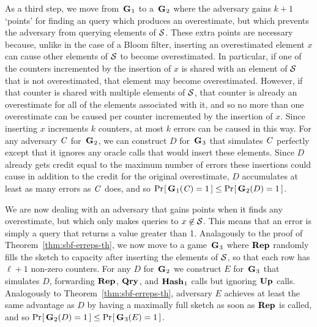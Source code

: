 As a third step, we move from~$\textup{\textbf{G}}\hspace{0.5pt}_1$ to a~$\textup{\textbf{G}}\hspace{0.5pt}_2$ where the adversary gains
$k+1$ `points' for finding an query which produces an
overestimate, but which prevents the adversary from querying elements of $\mathcal{S}$.
These extra points are necessary because, unlike in the case of a Bloom
filter, inserting an overestimated element $x$ can cause other elements of
$\mathcal{S}$ to become overestimated. In particular, if one of the counters
incremented by the insertion of $x$ is shared with an element of $\mathcal{S}$ that is
not overestimated, that element may become overestimated. However, if that
counter is shared with multiple elements of $\mathcal{S}$, that counter is already an
overestimate for all of the elements associated with it, and so no more than one
overestimate can be caused per counter incremented by the insertion of $x$.
Since inserting $x$ increments $k$ counters, at most $k$ errors can be caused in
this way. For any adversary $\mathit{C}$ for~$\textup{\textbf{G}}\hspace{0.5pt}_2$, we can construct $D$
for~$\textup{\textbf{G}}\hspace{0.5pt}_3$ that simulates $\mathit{C}$ perfectly except that it ignores any oracle
calls that would insert these elements. Since $D$ already gets credit equal to
the maximum number of errors these insertions could cause in addition to the
credit for the original overestimate, $D$ accumulates at least as many errors as
$\mathit{C}$ does, and so $\Pr\hspace{-1pt}\left[\,\textup{\textbf{G}}\hspace{0.5pt}_1(\mathit{C}) = 1\,\right] \le \Pr\hspace{-1pt}\left[\,\textup{\textbf{G}}\hspace{0.5pt}_2(D) = 1\,\right]$.

We are now dealing with an adversary that gains points when it finds any
overestimate, but which only makes queries to $x\not\in\mathcal{S}$. This means that an
error is simply a query that returns a value greater than 1.
Analagously to the proof of Theorem~\ref{thm:sbf-erreps-th}, we now move to a
game~$\textup{\textbf{G}}\hspace{0.5pt}_3$ where $\textup{\textbf{Rep}}\hspace{0.5pt}$ randomly fills the sketch to capacity after
inserting the elements of $\mathcal{S}$, so that each row has $\ell+1$ non-zero
counters. For any $D$ for~$\textup{\textbf{G}}\hspace{0.5pt}_2$ we construct $E$ for~$\textup{\textbf{G}}\hspace{0.5pt}_3$ that
simulates $D$, forwarding $\textup{\textbf{Rep}}\hspace{0.5pt}$, $\textup{\textbf{Qry}}\hspace{0.5pt}$, and $\textup{\textbf{Hash}}\hspace{0.5pt}_1$ calls but ignoring
$\textup{\textbf{Up}}\hspace{0.5pt}$ calls. Analogously to Theorem~\ref{thm:sbf-erreps-th}, adversary $E$ achieves at least the same
advantage as $D$ by having a maximally full sketch as soon as $\textup{\textbf{Rep}}\hspace{0.5pt}$ is called,
and so $\Pr\hspace{-1pt}\left[\,\textup{\textbf{G}}\hspace{0.5pt}_2(D) = 1\,\right] \le \Pr\hspace{-1pt}\left[\,\textup{\textbf{G}}\hspace{0.5pt}_3(E) = 1\,\right]$.

